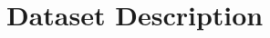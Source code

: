 \documentclass[../../main.tex]{subfiles}
\begin{document}
\section{Dataset Description}
\end{document}
